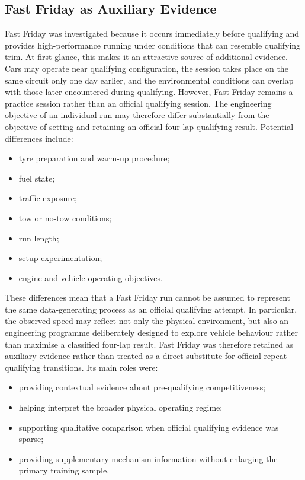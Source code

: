 \subsection{Fast Friday as Auxiliary Evidence}
Fast Friday was investigated because it occurs immediately before qualifying and provides high-performance running under conditions that can resemble qualifying trim. At first glance, this makes it an attractive source of additional evidence. Cars may operate near qualifying configuration, the session takes place on the same circuit only one day earlier, and the environmental conditions can overlap with those later encountered during qualifying. However, Fast Friday remains a practice session rather than an official qualifying session. The engineering objective of an individual run may therefore differ substantially from the objective of setting and retaining an official four-lap qualifying result. Potential differences include:

\begin{itemize}
\item tyre preparation and warm-up procedure;
\item fuel state;
\item traffic exposure;
\item tow or no-tow conditions;
\item run length;
\item setup experimentation;
\item engine and vehicle operating objectives.
\end{itemize}

These differences mean that a Fast Friday run cannot be assumed to represent the same data-generating process as an official qualifying attempt. In particular, the observed speed may reflect not only the physical environment, but also an engineering programme deliberately designed to explore vehicle behaviour rather than maximise a classified four-lap result. Fast Friday was therefore retained as auxiliary evidence rather than treated as a direct substitute for official repeat qualifying transitions. Its main roles were:

\begin{itemize}
\item providing contextual evidence about pre-qualifying competitiveness;
\item helping interpret the broader physical operating regime;
\item supporting qualitative comparison when official qualifying evidence was sparse;
\item providing supplementary mechanism information without enlarging the primary training sample.
\end{itemize}


